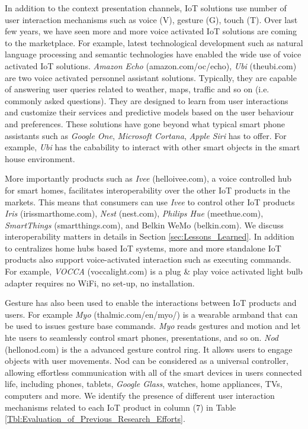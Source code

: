 \documentclass[journal]{IEEEtran}
\begin{document}
In addition to the context presentation  channels, IoT solutions use number of user interaction mechanisms such as voice (V), gesture (G), touch (T). Over last few years, we have seen more and more voice activated IoT solutions are coming to the marketplace. For example, latest technological development such as natural language processing and semantic technologies have enabled the wide use of  voice activated IoT solutions. \textit{Amazon Echo} (amazon.com/oc/echo), \textit{Ubi} (theubi.com) are  two voice activated personnel assistant solutions.  Typically, they are capable of answering user queries related to weather, maps, traffic and so on (i.e. commonly asked questions). They are designed to learn from user interactions and customize their services and predictive models based on the user behaviour and preferences. These solutions have gone beyond what typical smart phone assistants such as \textit{Google One}, \textit{Microsoft Cortana}, \textit{Apple Siri} has to offer. For example, \textit{Ubi} has the cabability to interact with other smart objects in the smart house environment.


More importantly products such as \textit{Ivee} (helloivee.com), a voice controlled hub for smart homes, facilitates interoperability over the other IoT products in the markets. This means that consumers can use \textit{Ivee} to control other IoT products \textit{Iris} (irissmarthome.com), \textit{Nest} (nest.com), \textit{Philips Hue} (meethue.com), \textit{SmartThings} (smartthings.com), and Belkin WeMo (belkin.com). We discuss interoperability matters in details in Section \ref{sec:Lessons_Learned}. In addition to centralizes home hubs based IoT systems, more and more standalone IoT products also support voice-activated interaction such as executing commands. For example, \textit{VOCCA} (voccalight.com) is a  plug \& play voice activated light bulb adapter requires no WiFi, no set-up, no installation. 

Gesture has also been used to enable the interactions between IoT products and users. For example \textit{Myo} (thalmic.com/en/myo/) is a wearable armband that can be used to issues gesture base commands. \textit{Myo} reads gestures and motion and let hte users to seamlessly control smart phones, presentations, and so on. \textit{Nod} (hellonod.com) is the a advanced gesture control ring. It allows users to engage objects with user movements. Nod can be considered as a universal controller, allowing effortless communication with all of the smart devices in users connected life, including phones, tablets, \textit{Google Glass}, watches, home appliances, TVs, computers and more. We identify the presence of different user interaction mechanisms related to each IoT product  in column (7) in Table \ref{Tbl:Evaluation_of_Previous_Research_Efforts}.
\end{document}
